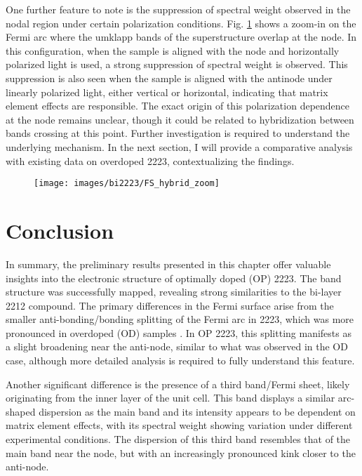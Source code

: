 One further feature to note is the suppression of spectral weight observed in the nodal region under certain polarization conditions.
Fig. \ref{fig:fs_hybrid} shows a zoom-in on the Fermi arc where the umklapp bands of the superstructure overlap at the node.
In this configuration, when the sample is aligned with the node and horizontally polarized light is used, a strong suppression of spectral weight is observed.
This suppression is also seen when the sample is aligned with the antinode under linearly polarized light, either vertical or horizontal, indicating that matrix element effects are responsible.
The exact origin of this polarization dependence at the node remains unclear, though it could be related to hybridization between bands crossing at this point.
Further investigation is required to understand the underlying mechanism.
In the next section, I will provide a comparative analysis with existing data on overdoped 2223, contextualizing the findings.

\begin{figure}[h!]
	\centering
	\texttt{[image: images/bi2223/FS\_hybrid\_zoom]}
	\caption{}
	\label{fig:fs_hybrid}
\end{figure}

\section{Conclusion}

In summary, the preliminary results presented in this chapter offer valuable insights into the electronic structure of optimally doped (OP) 2223.
The band structure was successfully mapped, revealing strong similarities to the bi-layer 2212 compound.
The primary differences in the Fermi surface arise from the smaller anti-bonding/bonding splitting of the Fermi arc in 2223, which was more pronounced in overdoped (OD) samples \cite{luo_electronic_2023}.
In OP 2223, this splitting manifests as a slight broadening near the anti-node, similar to what was observed in the OD case, although more detailed analysis is required to fully understand this feature.

Another significant difference is the presence of a third band/Fermi sheet, likely originating from the inner  layer of the unit cell.
This band displays a similar arc-shaped dispersion as the main band and its intensity appears to be dependent on matrix element effects, with its spectral weight showing variation under different experimental conditions.
The dispersion of this third band resembles that of the main band near the node, but with an increasingly pronounced kink closer to the anti-node.

